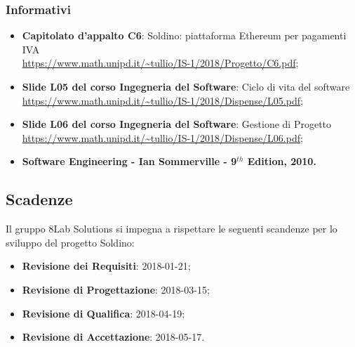 \subsubsection{Informativi}
\begin{itemize}
	\item \textbf{Capitolato d'appalto C6}: Soldino: piattaforma Ethereum per pagamenti IVA \\
	\url{https://www.math.unipd.it/~tullio/IS-1/2018/Progetto/C6.pdf};
	\item \textbf{Slide L05 del corso Ingegneria del Software}: Ciclo di vita 
	del software \\
	\url{https://www.math.unipd.it/~tullio/IS-1/2018/Dispense/L05.pdf};
	\item \textbf{Slide L06 del corso Ingegneria del Software}: Gestione di 
	Progetto \\
	\url{https://www.math.unipd.it/~tullio/IS-1/2018/Dispense/L06.pdf};
	\item \textbf{Software Engineering - Ian Sommerville - 9$^{th}$ Edition, 
	2010.}
\end{itemize}

\hypertarget{scadenze}{\subsection{Scadenze}}
Il gruppo 8Lab Solutions si impegna a rispettare le seguenti scandenze per lo 
sviluppo del progetto Soldino:

\begin{itemize}
	\item \textbf{Revisione dei Requisiti}: 2018-01-21;
	\item \textbf{Revisione di Progettazione}: 2018-03-15;
	\item \textbf{Revisione di Qualifica}: 2018-04-19;
	\item \textbf{Revisione di Accettazione}: 2018-05-17.
\end{itemize}